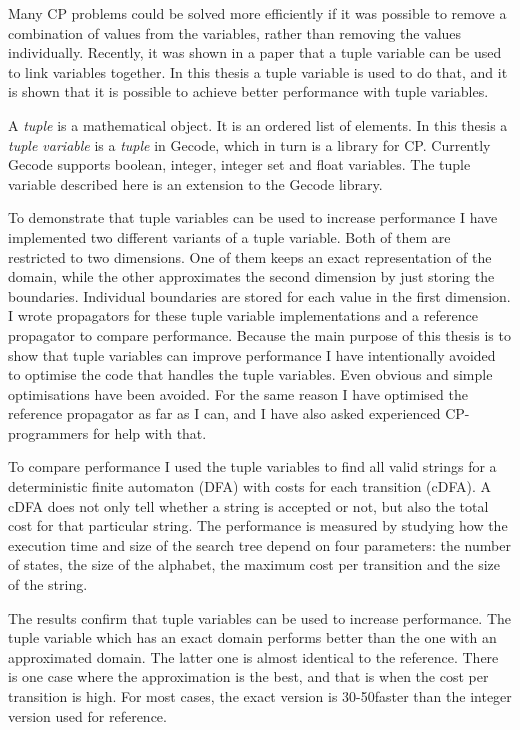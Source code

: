 \documentclass[a4paper,11pt]{article}
\begin{document}
Many CP problems could be solved more efficiently if it was possible to remove a combination of values from the variables, rather than removing the values individually. Recently, it was shown in a paper\cite{Monette771427} that a tuple variable can be used to link variables together. In this thesis a tuple variable is used to do that, and it is shown that it is possible to achieve better performance with tuple variables. 

A \textit{tuple} is a mathematical object. It is an ordered list of elements. In this thesis a \textit{tuple variable} is a \textit{tuple} in Gecode, which in turn is a library for CP. Currently Gecode supports boolean, integer, integer set and float variables. The tuple variable described here is an extension to the Gecode library.

To demonstrate that tuple variables can be used to increase performance I have implemented two different variants of a tuple variable. Both of them are restricted to two dimensions. One of them keeps an exact representation of the domain, while the other approximates the second dimension by just storing the boundaries. Individual boundaries are stored for each value in the first dimension. I wrote propagators for these tuple variable implementations and a reference propagator to compare performance. Because the main purpose of this thesis is to show that tuple variables can improve performance I have intentionally avoided to optimise the code that handles the tuple variables. Even obvious and simple optimisations have been avoided. For the same reason I have optimised the reference propagator as far as I can, and I have also asked experienced CP-programmers for help with that.

To compare performance I used the tuple variables to find all valid strings for a deterministic finite automaton (DFA) with costs for each transition (cDFA). A cDFA does not only tell whether a string is accepted or not, but also the total cost for that particular string. The performance is measured by studying how the execution time and size of the search tree depend on four parameters: the number of states, the size of the alphabet, the maximum cost per transition and the size of the string.

The results confirm that tuple variables can be used to increase performance. The tuple variable which has an exact domain performs better than the one with an approximated domain. The latter one is almost identical to the reference. There is one case where the approximation is the best, and that is when the cost per transition is high. For most cases, the exact version is 30-50\percent faster than the integer version used for reference.
\end{document}
